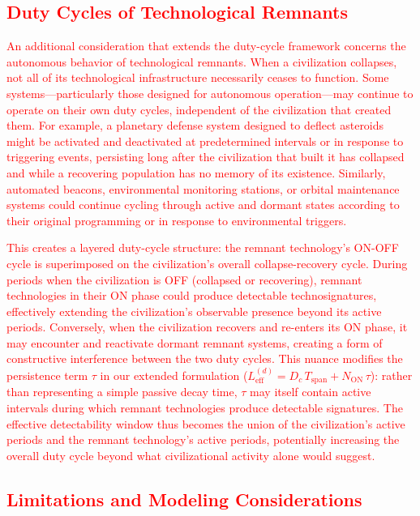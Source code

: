 \textcolor{red}{\subsection{Duty Cycles of Technological Remnants}\label{duty-cycles-remnants}}

\textcolor{red}{An additional consideration that extends the duty-cycle framework concerns the autonomous behavior of technological remnants. When a civilization collapses, not all of its technological infrastructure necessarily ceases to function. Some systems---particularly those designed for autonomous operation---may continue to operate on their own duty cycles, independent of the civilization that created them. For example, a planetary defense system designed to deflect asteroids might be activated and deactivated at predetermined intervals or in response to triggering events, persisting long after the civilization that built it has collapsed and while a recovering population has no memory of its existence. Similarly, automated beacons, environmental monitoring stations, or orbital maintenance systems could continue cycling through active and dormant states according to their original programming or in response to environmental triggers.}

\textcolor{red}{This creates a layered duty-cycle structure: the remnant technology's ON-OFF cycle is superimposed on the civilization's overall collapse-recovery cycle. During periods when the civilization is OFF (collapsed or recovering), remnant technologies in their ON phase could produce detectable technosignatures, effectively extending the civilization's observable presence beyond its active periods. Conversely, when the civilization recovers and re-enters its ON phase, it may encounter and reactivate dormant remnant systems, creating a form of constructive interference between the two duty cycles. This nuance modifies the persistence term $\tau$ in our extended formulation ($L_{\mathrm{eff}}^{(d)} = D_c \, T_{\mathrm{span}} + N_{\mathrm{ON}} \, \tau$): rather than representing a simple passive decay time, $\tau$ may itself contain active intervals during which remnant technologies produce detectable signatures. The effective detectability window thus becomes the union of the civilization's active periods and the remnant technology's active periods, potentially increasing the overall duty cycle beyond what civilizational activity alone would suggest.}

\textcolor{red}{\subsection{Limitations and Modeling Considerations}\label{limitations}}

